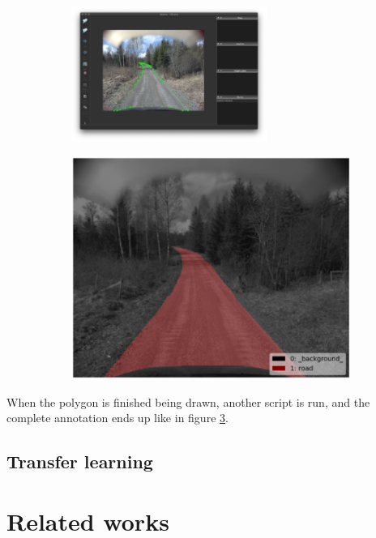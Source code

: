 \documentclass[USenglish]{ifimaster}  %
\begin{document}
\begin{figure}[ht]
\centering
\begin{subfigure}{.6\textwidth}
\includegraphics[width=0.7\textwidth]{bilder/annotating.png}
\label{fig:annotate}
\end{subfigure}
\begin{subfigure}{.6\textwidth}
\includegraphics[width=.7\linewidth]{bilder/label_viz.png}
\label{fig:finished_annotation}
\end{subfigure}
\end{figure}

When the polygon is finished being drawn, another script is run, and the complete annotation ends up like in figure \cref{fig:finished_annotation}.  


\section{Transfer learning}

\chapter{Related works}
\end{document}
